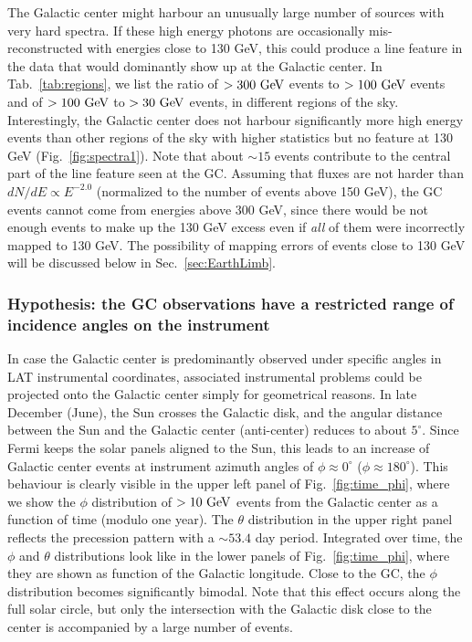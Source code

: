 \documentclass[aps,twocolumn,prd,superscriptaddress,showpacs,nofootinbib,fixfloat]{revtex4}
\newcommand{\GeV}{{\rm ~GeV}}
\begin{document}
The Galactic center might harbour an unusually large number
of sources with very hard spectra. If these high energy
photons are occasionally mis-reconstructed with energies
close to 130 GeV, this could produce a line feature in the
data that would dominantly show up at the Galactic center.
In Tab.~\ref{tab:regions}, we list the ratio of $>300\GeV$
events to $>100\GeV$ events and of $>100\GeV$ to $>30\GeV$
events, in different regions of the sky.  Interestingly, the
Galactic center does not harbour significantly more high
energy events than other regions of the sky with higher
statistics but no feature at 130 GeV
(Fig.~\ref{fig:spectra1}). Note that
about $\sim15$ events contribute to the central part of the
line feature seen at the GC. Assuming that fluxes are not
harder than $dN/dE \propto E^{-2.0}$ (normalized to the
number of events above 150 GeV), the GC events cannot come
from energies above 300 GeV, since there would be not enough
events to make up the 130 GeV excess even if \emph{all} of
them were incorrectly mapped to 130 GeV. The possibility of
mapping errors of events close to 130 GeV will be discussed
below in Sec.~\ref{sec:EarthLimb}.

\subsubsection{Hypothesis: the GC observations have a
restricted range of incidence angles on the instrument}

In case the Galactic center is predominantly observed under
specific angles in LAT instrumental coordinates, associated
instrumental problems could be projected onto the Galactic
center simply for geometrical reasons. 
In late December (June), the Sun crosses the Galactic disk,
and the angular
distance between the Sun and the Galactic center
(anti-center) reduces to about $5^\circ$. Since Fermi keeps
the solar panels aligned to the Sun, this leads to an
increase of Galactic center events at instrument azimuth
angles of $\phi\approx 0^\circ$ ($\phi\approx 180^\circ$).
This behaviour is clearly visible in the upper left panel of
Fig.~\ref{fig:time_phi}, where we show the $\phi$
distribution of $>10\GeV$ events from the Galactic center as
a function of time (modulo one year).  The $\theta$
distribution in the upper right panel reflects the
precession pattern with a $\sim53.4$ day period. Integrated
over time, the $\phi$ and $\theta$ distributions look like
in the lower panels of Fig.~\ref{fig:time_phi}, where they
are shown as function of the Galactic longitude. Close to
the GC, the $\phi$ distribution becomes significantly
bimodal. Note that this effect occurs along the full solar
circle, but only the intersection with the Galactic disk
close to the center is accompanied by a large number of
events.
\end{document}
